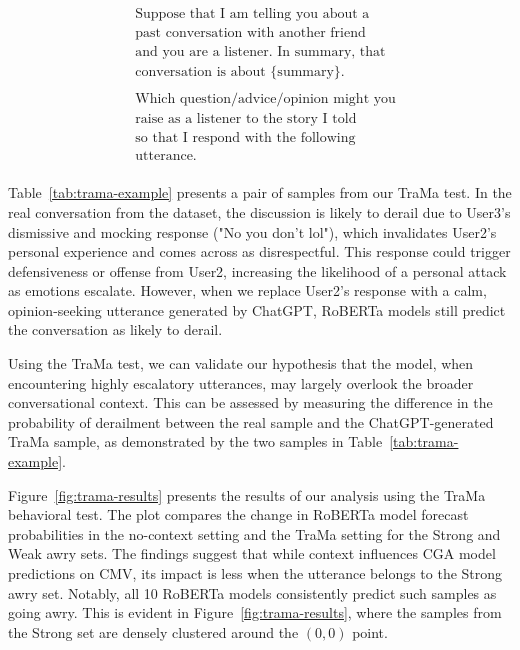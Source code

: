 {\ttfamily
\begin{align*}
& \text{Suppose that I am telling you about a}\\
& \text{past conversation with another friend}\\
& \text{and you are a listener. In summary, that}\\ 
& \text{conversation is about \{summary\}.}\\
& \\
& \text{Which question/advice/opinion might you}\\
& \text{raise as a listener to the story I told}\\ 
& \text{so that I respond with the following}\\ 
& \text{utterance.}\\ 
\end{align*}
}

Table~\ref{tab:trama-example} presents a pair of samples from our TraMa test. In the real conversation from the dataset, the discussion is likely to derail due to User3's dismissive and mocking response ("No you don't lol"), which invalidates User2's personal experience and comes across as disrespectful. This response could trigger defensiveness or offense from User2, increasing the likelihood of a personal attack as emotions escalate. However, when we replace User2's response with a calm, opinion-seeking utterance generated by ChatGPT, RoBERTa models still predict the conversation as likely to derail.



Using the TraMa test, we can validate our hypothesis that the model, when encountering highly escalatory utterances, may largely overlook the broader conversational context. This can be assessed by measuring the difference in the probability of derailment between the real sample and the ChatGPT-generated TraMa sample, as demonstrated by the two samples in Table~\ref{tab:trama-example}. 

Figure~\ref{fig:trama-results} presents the results of our analysis using the TraMa behavioral test. 
The plot compares the change in RoBERTa model forecast probabilities in the no-context setting and the TraMa setting for the Strong and Weak awry sets.
The findings suggest that while context influences CGA model predictions on CMV, its impact is less when the utterance belongs to the Strong awry set. 
Notably, all 10 RoBERTa models consistently predict such samples as going awry. 
This is evident in Figure~\ref{fig:trama-results}, where the samples from the Strong set are densely clustered around the $(0, 0)$ point. 


